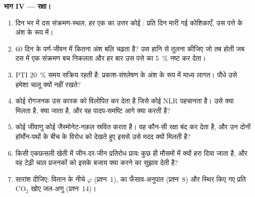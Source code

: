 \begin{problem}
\medskip
\noindent\textbf{भाग IV --- रक्षा।}
\begin{enumerate}[resume]
  \item दिन भर में दस संक्रमण-स्थल, हर एक का उत्तर कोई : प्रति दिन मारी गई कोशिकाएँ, उस पत्ते के अंश के रूप
        में।
  \item 60 दिन के पर्ण-जीवन में कितना अंश बलि चढ़ता है? उस हानि से
        तुलना कीजिए जो तब होती जब दस में एक संक्रमण बच निकलता और हर बार
        उस पत्ते का \qty{5}{\%} नष्ट कर देता।
  \item PTI \qty{20}{\%} समय सक्रिय रहती है: प्रकाश-संश्लेषण के अंश के
        रूप में माध्य लागत। पौधे उसे हमेशा चालू क्यों नहीं रखते?
  \item कोई रोगजनक उस कारक को विलोपित कर देता है जिसे कोई NLR पहचानता
        है। उसे क्या मिलता है, क्या जाता है, और वह पादप-समष्टि आगे क्या
        करती है?
  \item कोई जीवाणु कोई जैस्मोनेट-नक़ल स्रवित करता है। वह कौन-सी रक्षा
        बंद कर देता है, और उन दोनों हॉर्मोन-पथों के बीच के विरोध को
        देखते हुए इससे उसे मदद क्यों मिलती है?
  \item किसी एकफ़सली खेती में जीन-दर-जीन प्रतिरोध प्रायः कुछ ही मौसमों
        में क्यों हरा दिया जाता है, और वह टेढ़ी चाल प्रजनकों को इसके
        बजाय क्या करने का सुझाव देती है?
  \item सारांश दीजिए: वितान के नीचे $\varphi$ (प्रश्न~1),  का
        फँसाव-अनुपात (प्रश्न~8) और स्थिर किए गए प्रति CO$_{2}$ खोए
        जल-अणु (प्रश्न~14)।
\end{enumerate}
\end{problem}
